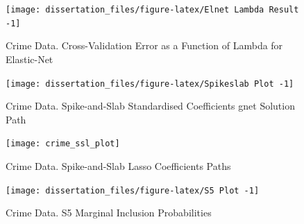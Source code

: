 \documentclass[
  11pt,
]{article}
\begin{document}
\begin{figure}[H]

{\centering \texttt{[image: dissertation\_files/figure-latex/Elnet Lambda Result -1]} 

}

\caption{Crime Data. Cross-Validation Error as a Function of Lambda for Elastic-Net}\label{fig:Elnet Lambda Result }
\end{figure}

\begin{figure}[H]

{\centering \texttt{[image: dissertation\_files/figure-latex/Spikeslab Plot -1]} 

}

\caption{Crime Data. Spike-and-Slab Standardised Coefficients gnet Solution Path}\label{fig:Spikeslab Plot }
\end{figure}

\begin{figure}[H]

{\centering \texttt{[image: crime\_ssl\_plot]} 

}

\caption{Crime Data. Spike-and-Slab Lasso Coefficients Paths}\label{fig:SSLASSO Plot}
\end{figure}

\begin{figure}[H]

{\centering \texttt{[image: dissertation\_files/figure-latex/S5 Plot -1]} 

}

\caption{Crime Data. S5 Marginal Inclusion Probabilities}\label{fig:S5 Plot }
\end{figure}
\end{document}
